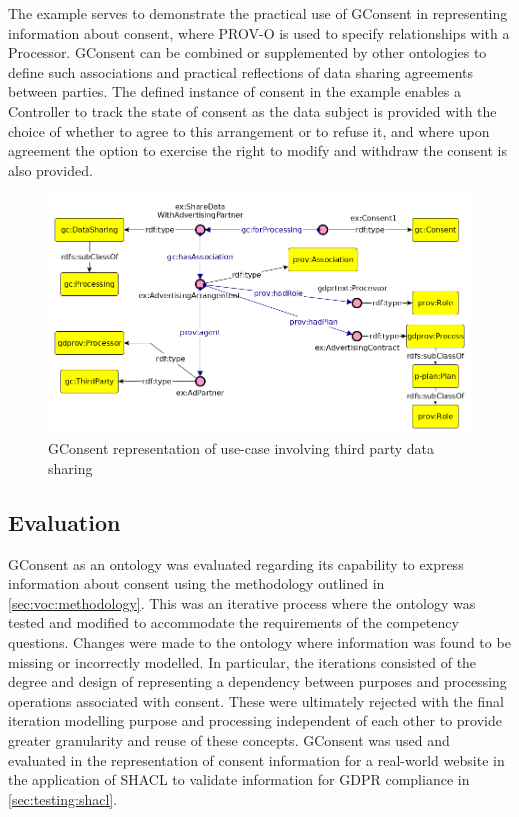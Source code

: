 The example serves to demonstrate the practical use of GConsent in representing information about consent, where PROV-O is used to specify relationships with a Processor. GConsent can be combined or supplemented by other ontologies to define such associations and practical reflections of data sharing agreements between parties. The defined instance of consent in the example enables a Controller to track the state of consent as the data subject is provided with the choice of whether to agree to this arrangement or to refuse it, and where upon agreement the option to exercise the right to modify and withdraw the consent is also provided.
\begin{figure}[htbp]
    \centering
    \includegraphics[width=0.8\linewidth]{img/gconsent_third_party_datasharing.png}
    \caption{GConsent representation of use-case involving third party data sharing \cite{pandit_gconsent_2019}}
    \label{fig:vocabs:gconsent-example}
\end{figure}

\subsection{Evaluation}\label{sec:voc:gconsent:evaluation}
GConsent as an ontology was evaluated regarding its capability to express information about consent using the methodology outlined in \autoref{sec:voc:methodology}.
This was an iterative process where the ontology was tested and modified to accommodate the requirements of the competency questions. Changes were made to the ontology where information was found to be missing or incorrectly modelled.
In particular, the iterations consisted of the degree and design of representing a dependency between purposes and processing operations associated with consent. These were ultimately rejected with the final iteration modelling purpose and processing independent of each other to provide greater granularity and reuse of these concepts.
GConsent was used and evaluated in the representation of consent information for a real-world website in the application of SHACL to validate information for GDPR compliance in \autoref{sec:testing:shacl}.

